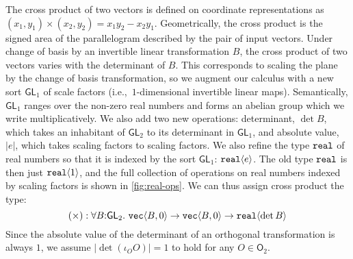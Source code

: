 \documentclass{sigplanconf}
\newcommand{\abs}[1]{\lvert #1 \rvert}
\newcommand{\SynGL}[1]{\mathsf{GL}_#1}
\newcommand{\SynOrth}[1]{\mathsf{O}_#1}
\newcommand{\tyPrim}[2]{\textup{\texttt{#1}}\langle #2 \rangle}
\newcommand{\tyPrimNm}[1]{\textup{\texttt{#1}}}
\theoremstyle{examplestyle}
\theoremstyle{restatementstyle}
\begin{document}
The cross product of two vectors is defined on coordinate
representations as $(x_1,y_1) \times (x_2,y_2) = x_1y_2 - x_2y_1$.
Geometrically, the cross product is the signed area of the
parallelogram described by the pair of input vectors.  Under change of
basis by an invertible linear transformation $B$, the cross product of
two vectors varies with the determinant of $B$. This corresponds to
scaling the plane by the change of basis transformation, so we augment
our calculus with a new sort $\SynGL{1}$ of scale factors
(i.e.,~$1$-dimensional invertible linear maps). Semantically,
$\SynGL{1}$ ranges over the non-zero real numbers and forms an abelian
group which we write multiplicatively. We also add two new operations:
determinant, $\det B$, which takes an inhabitant of $\SynGL{2}$ to its
determinant in $\SynGL{1}$, and absolute value, $\abs{e}$, which takes
scaling factors to scaling factors. We also refine the type
$\tyPrimNm{real}$ of real numbers so that it is indexed by the sort
$\SynGL{1}$: $\tyPrim{real}{e}$. The old type $\tyPrimNm{real}$ is
then just $\tyPrim{real}{1}$, and the full collection of operations on
real numbers indexed by scaling factors is shown in
\autoref{fig:real-ops}. We can thus assign cross product the type:
\begin{displaymath}
  (\times) : \forall B \mathord: \SynGL{2}.\ \tyPrim{vec}{B,0} \to
  \tyPrim{vec}{B,0} \to \tyPrim{real}{\det B} 
\end{displaymath}
Since the absolute value of the determinant of an orthogonal
transformation is always $1$, we assume $\abs{\det (\iota_O O)} = 1$
to hold for any $O \in \SynOrth{2}$.
\end{document}
